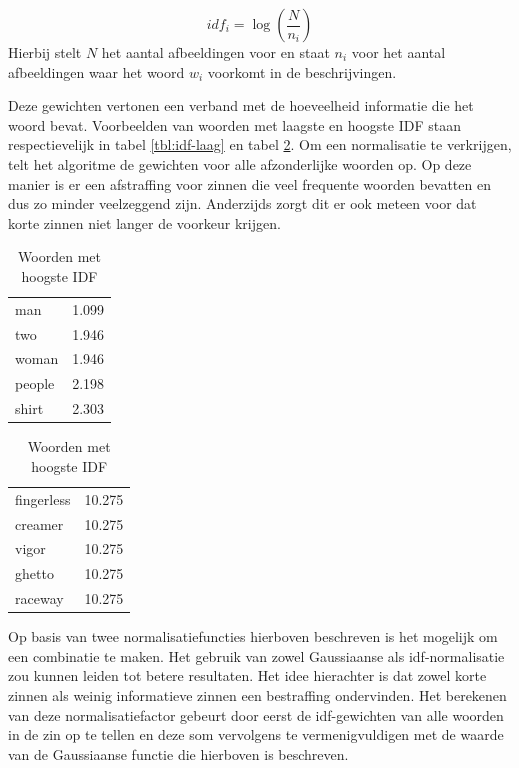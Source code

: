 \begin{equation}
    idf_i = \log(\frac{N}{n_i})
\end{equation}
Hierbij stelt $N$ het aantal afbeeldingen voor en staat $n_i$ voor het aantal afbeeldingen waar het woord $w_i$ voorkomt in de beschrijvingen.

Deze gewichten vertonen een verband met de hoeveelheid informatie die het woord bevat. Voorbeelden van woorden met laagste en hoogste IDF staan respectievelijk in tabel \ref{tbl:idf-laag} en tabel \ref{tbl:idf-hoog}. Om een normalisatie te verkrijgen, telt het algoritme de gewichten voor alle afzonderlijke woorden op. Op deze manier is er een afstraffing voor zinnen die veel frequente woorden bevatten en dus zo minder veelzeggend zijn. Anderzijds zorgt dit er ook meteen voor dat korte zinnen niet langer de voorkeur krijgen.


\begin{table}[!htb]
	\caption*{Gestemde woorden samen met hun IDF-gewicht}
	\begin{minipage}{.5\linewidth}
		\caption{Woorden met laagste IDF}
		\label{tbl:idf-laag}
		\centering
		\begin{tabular}{ll}
    man    & 1.099 \\
    two    & 1.946 \\
    woman  & 1.946 \\
    people & 2.198 \\
    shirt  & 2.303 \\
		\end{tabular}
	\end{minipage}%
	\begin{minipage}{.5\linewidth}
		\centering
		\caption{Woorden met hoogste IDF}
		\label{tbl:idf-hoog}
		\begin{tabular}{ll}
	fingerless & 10.275\\
	creamer& 10.275\\
	vigor& 10.275\\
	ghetto& 10.275\\
	raceway& 10.275\\
		\end{tabular}
	\end{minipage} 
\end{table}

Op basis van twee normalisatiefuncties hierboven beschreven is het mogelijk om een combinatie te maken. Het gebruik van zowel Gaussiaanse als idf-normalisatie zou kunnen leiden tot betere resultaten. Het idee hierachter is dat zowel korte zinnen als weinig informatieve zinnen een bestraffing ondervinden. Het berekenen van deze normalisatiefactor gebeurt door eerst de idf-gewichten van alle woorden in de zin op te tellen en deze som vervolgens te vermenigvuldigen met de waarde van de Gaussiaanse functie die hierboven is beschreven.

